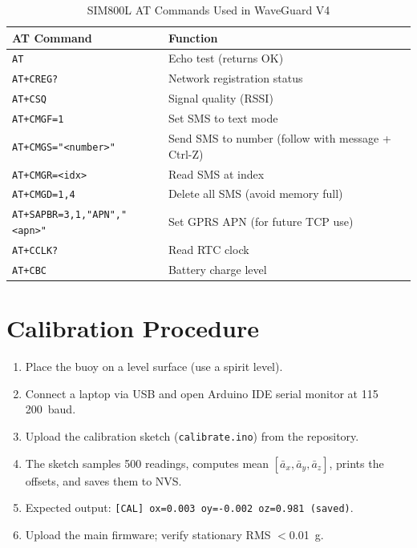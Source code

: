 \begin{table}[H]
\centering
\caption{SIM800L AT Commands Used in WaveGuard V4}
\label{tab:atcmds}
\begin{tabular}{ll}
\toprule
\textbf{AT Command}            & \textbf{Function} \\
\midrule
\texttt{AT}                    & Echo test (returns OK) \\
\texttt{AT+CREG?}              & Network registration status \\
\texttt{AT+CSQ}                & Signal quality (RSSI) \\
\texttt{AT+CMGF=1}             & Set SMS to text mode \\
\texttt{AT+CMGS="<number>"}    & Send SMS to number (follow with message + Ctrl-Z) \\
\texttt{AT+CMGR=<idx>}         & Read SMS at index \\
\texttt{AT+CMGD=1,4}           & Delete all SMS (avoid memory full) \\
\texttt{AT+SAPBR=3,1,"APN","<apn>"}& Set GPRS APN (for future TCP use) \\
\texttt{AT+CCLK?}              & Read RTC clock \\
\texttt{AT+CBC}                & Battery charge level \\
\bottomrule
\end{tabular}
\end{table}

\chapter{Calibration Procedure}
\label{app:calibration}

\begin{enumerate}
  \item Place the buoy on a level surface (use a spirit level).
  \item Connect a laptop via USB and open Arduino IDE serial monitor at 115\,200~baud.
  \item Upload the calibration sketch (\texttt{calibrate.ino}) from the repository.
  \item The sketch samples 500 readings, computes mean $[\bar{a}_x, \bar{a}_y,
        \bar{a}_z]$, prints the offsets, and saves them to NVS.
  \item Expected output: \texttt{[CAL] ox=0.003 oy=-0.002 oz=0.981 (saved)}.
  \item Upload the main firmware; verify stationary RMS $<$0.01~g.
\end{enumerate}

